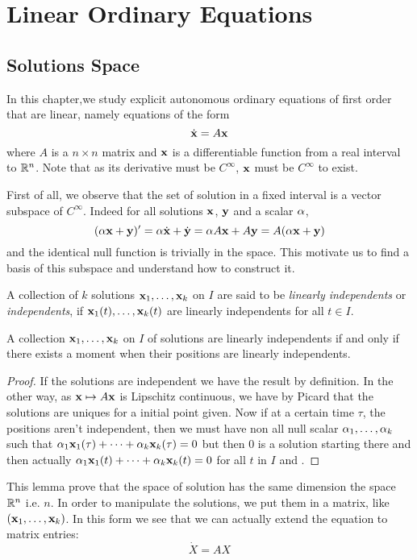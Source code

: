 \chapter{Linear Ordinary Equations}
\section{Solutions Space}
In this chapter,we study explicit autonomous ordinary equations of first order that are linear, namely equations of the form 
\[\dot{\mathbf{x}}=A\mathbf{x}\]
where $A$ is a $n\times n$ matrix and $\mathbf{x}$ is a differentiable function from a real interval to $\mathbb{R}^n$. Note that as its derivative must be $C^\infty$, $\mathbf{x}$ must be $C^\infty$ to exist. 

First of all, we observe that the set of solution in a fixed interval is a vector subspace of $C^\infty$. Indeed for all solutions $\mathbf{x}$, $\mathbf{y}$ and a scalar $\alpha$, \[(\alpha\mathbf{x}+\mathbf{y})'=\alpha\dot{\mathbf{x}} + \dot{\mathbf{y}}=\alpha A\mathbf{x} + A\mathbf{y}=A(\alpha\mathbf{x}+\mathbf{y})\] and the identical null function is trivially in the space. This motivate us to find a basis of this subspace and understand how to construct it.
\begin{definition}
    A collection of $k$ solutions $\mathbf{x}_1,\dots,\mathbf{x}_k$ on $I$ are said to be \emph{linearly independents} or \emph{independents}, if $\mathbf{x}_1(t),\dots,\mathbf{x}_k(t)$ are linearly independents for all $t\in I$.
\end{definition}
\begin{lemme}
A collection $\mathbf{x}_1,\dots,\mathbf{x}_k$ on $I$ of solutions are linearly independents if and only if there exists a moment when their positions are linearly independents.
\end{lemme}
\begin{proof}
If the solutions are independent we have the result by definition. In the other way, as $\mathbf{x}\mapsto A\mathbf{x}$ is Lipschitz continuous, we have by Picard that the solutions are uniques for a initial point given. Now if at a certain time $\tau$, the positions aren't independent, then we must have non all null scalar $\alpha_1,\dots,\alpha_k$ such that  $\alpha_1\mathbf{x}_1(\tau) + \dots + \alpha_k\mathbf{x}_k(\tau)=0$ but then 0 is a solution starting there and then actually  $\alpha_1\mathbf{x}_1(t) + \dots + \alpha_k\mathbf{x}_k(t)=0$ for all $t$ in $I$ and .
\end{proof}
This lemma prove that the space of solution has the same dimension the space $\mathbb{R}^n$ i.e. $n$.
In order to manipulate the solutions, we put them in a matrix, like $(\mathbf{x}_1,\dots,\mathbf{x}_k)$. In this form we see that we can actually extend the equation to matrix entries: 
\[\dot{X}=AX\]
